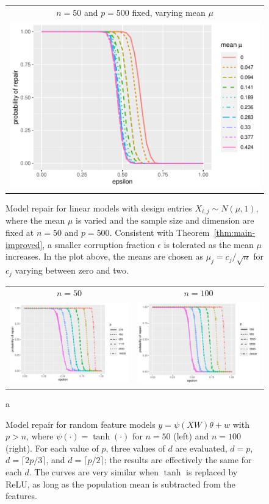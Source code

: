 \begin{figure}[t]
  \begin{center}
    \begin{tabular}{c}
      $n=50$ and $p=500$ fixed, varying mean $\mu$\\
      \includegraphics[width=.45\textwidth]{figures/fig5}
    \end{tabular}
  \end{center}
\caption{Model repair for linear models with design entries $X_{i,j}\sim N(\mu, 1)$,
where the mean $\mu$ is varied and the sample size and dimension are fixed at $n=50$ and $p=500$. Consistent with Theorem~\ref{thm:main-improved}, a smaller corruption fraction $\epsilon$ is tolerated as the mean $\mu$ increases. In the plot above, the means are chosen as $\mu_j = c_j/\sqrt{n}$ for $c_j$ varying between zero and two.}
\label{fig:mean}
\vskip5pt
\begin{center}
  \begin{tabular}{cc}
    {\scriptsize $n=50$} & {\scriptsize $n=100$} \\
    \includegraphics[width=.45\textwidth]{figures/fig6a} &
    \includegraphics[width=.45\textwidth]{figures/fig6b}\\[-10pt]
  \end{tabular}
\end{center}
\caption{Model repair for random feature models $y=\psi(XW)\theta + w$ with $p>n$, where $\psi(\cdot) = \tanh(\cdot)$
for $n=50$ (left) and $n=100$ (right). For each value of $p$, three values of $d$ are evaluated, $d=p$, $d=\lceil 2p/3\rceil$,
and $d=\lceil p/2\rceil$; the results are effectively the same for each $d$. The curves are very similar when $\tanh$ is replaced by ReLU, as long as the population mean is subtracted from the features.}
\label{fig:rf}a
\end{figure}


